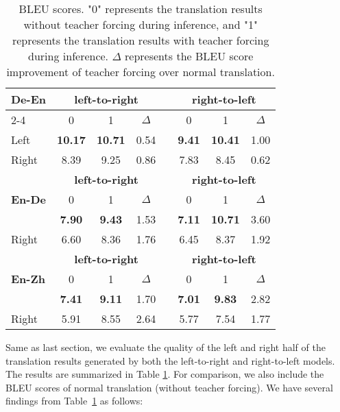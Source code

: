 \documentclass[11pt,a4paper]{article}
\begin{document}
\begin{table}[!tbp]
\small
\centering %
\begin{tabular}{ l  c  c  c  c  c  c  c  } %
\toprule
\multirow{3}{*}{\textbf{De-En}}   & \multicolumn{3}{c}{\textbf{left-to-right}} & & \multicolumn{3}{c}{\textbf{right-to-left}} \\
\cmidrule{2-4}  \cmidrule{6-8}
 & 0 & 1 & $\Delta$ & & 0 & 1 & $\Delta$  \\
\midrule
  Left & \textbf{10.17} & \textbf{10.71} & 0.54 & & \textbf{9.41} & \textbf{10.41} &  1.00\\
Right & 8.39 & 9.25 &  0.86 & & 7.83  & 8.45 & 0.62  \\
\bottomrule\bottomrule
\multirow{3}{*}{\textbf{En-De}}  & \multicolumn{3}{c}{\textbf{left-to-right}} & & \multicolumn{3}{c}{\textbf{right-to-left}} \\
\cmidrule{2-4}  \cmidrule{6-8}
  & 0 & 1 & $\Delta$ & & 0 & 1 & $\Delta$  \\
\midrule
Left & \textbf{7.90} & \textbf{9.43} & 1.53 & & \textbf{7.11}  & \textbf{10.71} & 3.60\\
Right & 6.60 & 8.36 &  1.76 & & 6.45  & 8.37  & 1.92   \\
\bottomrule\bottomrule
\multirow{3}{*}{\textbf{En-Zh}}  & \multicolumn{3}{c}{\textbf{left-to-right}} & & \multicolumn{3}{c}{\textbf{right-to-left}} \\
\cmidrule{2-4}  \cmidrule{6-8}
  & 0 & 1 & $\Delta$ & & 0 & 1 & $\Delta$  \\
\midrule
Left & \textbf{7.41} & \textbf{9.11} & 1.70 & & \textbf{7.01} & \textbf{9.83} &2.82   \\
Right & 5.91 & 8.55 & 2.64 & & 5.77  & 7.54 & 1.77  \\


\bottomrule
\end{tabular}
\caption{BLEU scores. "0" represents the translation results without teacher forcing during inference, and "1" represents the translation results with teacher forcing during inference. $\Delta$ represents the BLEU score improvement of teacher forcing over normal translation.}
\label{feed}
\end{table}

Same as last section, we evaluate the quality of the left and right half of the translation results generated by both the left-to-right and right-to-left models. The results are summarized in Table \ref{feed}. For comparison, we also include the BLEU scores of normal translation (without teacher forcing). We have several findings from Table~\ref{feed} as follows:
\end{document}
